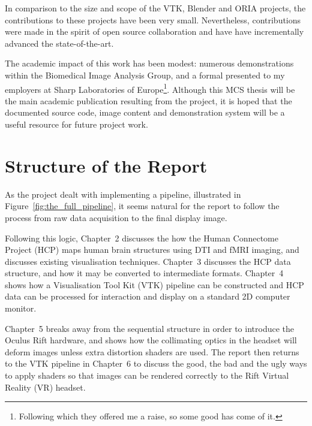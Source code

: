 \documentclass[MSc,paper=a4,pagesize=auto]{icldt}
\begin{document}
In comparison to the size and scope of the VTK, Blender and ORIA projects, the contributions to these projects have been very small. Nevertheless, contributions were made in the spirit of open source collaboration and have have incrementally advanced the state-of-the-art.

The academic impact of this work has been modest: numerous demonstrations within the Biomedical Image Analysis Group, and a formal presented to my employers at Sharp Laboratories of Europe\footnote{Following which they offered me a raise, so some good has come of it.}. Although this MCS thesis will be the main academic publication resulting from the project, it is hoped that the documented source code, image content and demonstration system will be a useful resource for future project work.

\newpage
\section{Structure of the Report} 
\label{sec:structure_of_the_report}
As the project dealt with implementing a pipeline, illustrated in Figure~\ref{fig:the_full_pipeline}, it seems natural for the report to follow the process from raw data acquisition to the final display image. 

Following this logic, Chapter~2 discusses the how the Human Connectome Project (HCP) maps human brain structures using DTI and fMRI imaging, and discusses existing visualisation techniques. Chapter~3 discusses the HCP data structure, and how it may be converted to intermediate formats. Chapter~4 shows how a Visualisation Tool Kit (VTK) pipeline can be constructed and HCP data can be processed for interaction and display on a standard 2D computer monitor. 

Chapter~5 breaks away from the sequential structure in order to introduce the Oculus Rift hardware, and shows how the collimating optics in the headset will deform images unless extra distortion shaders are used. The report then returns to the VTK pipeline in Chapter~6 to discuss the good, the bad and the ugly ways to apply shaders so that images can be rendered correctly to the Rift Virtual Reality (VR) headset. 
\end{document}
